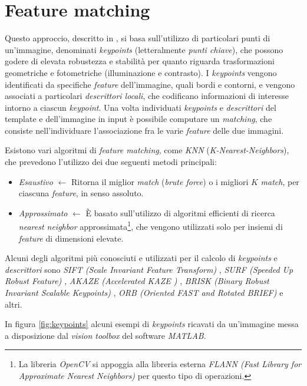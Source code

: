 \section{Feature matching}
\label{sec:feature-matching}
Questo approccio, descritto in \cite{bib:medium-feature-matching}, si basa sull'utilizzo di particolari punti di un'immagine, denominati \textit{keypoints} (letteralmente \textit{punti chiave}), che possono godere di elevata robustezza e stabilit\`a per quanto riguarda trasformazioni geometriche e fotometriche (illuminazione e contrasto). I \textit{keypoints} vengono identificati da specifiche \textit{feature} dell'immagine, quali bordi e contorni, e vengono associati a particolari \textit{descrittori locali}, che codificano informazioni di interesse intorno a ciascun \textit{keypoint}. Una volta individuati \textit{keypoints} e \textit{descrittori} del template e dell'immagine in input \`e possibile computare un \textit{matching}, che consiste nell'individuare l'associazione fra le varie \textit{feature} delle due immagini.\par
Esistono vari algoritmi di \textit{feature matching}, come \textit{KNN} (\textit{K-Nearest-Neighbors}), che prevedono l'utilizzo dei due seguenti metodi principali:
\begin{itemize}
	\item \textit{Esaustivo} $\gets$ Ritorna il miglior \textit{match} (\textit{brute force}) o i migliori $K$ \textit{match}, per ciascuna \textit{feature}, in senso assoluto.
	\item \textit{Approssimato} $\gets$ \`E basato sull'utilizzo di algoritmi efficienti di ricerca \textit{nearest neighbor} approssimata\footnote{La libreria \textit{OpenCV} si appoggia alla libreria esterna \textit{FLANN (Fast Library for Approximate Nearest Neighbors)} per questo tipo di operazioni.}, che vengono utilizzati solo per insiemi di \textit{feature} di dimensioni elevate.
\end{itemize}\par
Alcuni degli algoritmi pi\`u conosciuti e utilizzati per il calcolo di \textit{keypoints} e \textit{descrittori} sono \textit{SIFT (Scale Invariant Feature Transform)} \cite{bib:sift}, \textit{SURF (Speeded Up Robust Feature)} \cite{bib:surf}, \textit{AKAZE (Accelerated KAZE \cite{bib:kaze})} \cite{bib:akaze}, \textit{BRISK (Binary Robust Invariant Scalable Keypoints)} \cite{bib:brisk}, \textit{ORB (Oriented FAST and Rotated BRIEF)} \cite{bib:orb} e altri.\par
In figura \ref{fig:keypoints} alcuni esempi di \textit{keypoints} ricavati da un'immagine messa a disposizione dal \textit{vision toolbox} del software \textit{MATLAB}.
